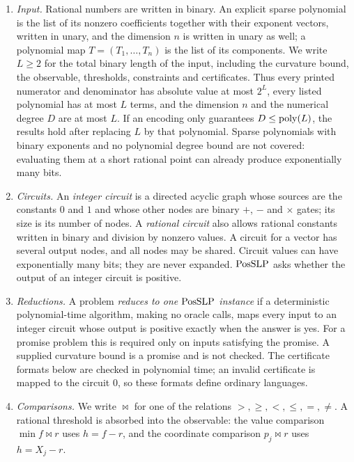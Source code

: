 \begin{enumerate}[label=(\roman*)]
\item \emph{Input.} Rational numbers are written in binary. An explicit
sparse polynomial is the list of its nonzero coefficients together with their
exponent vectors, written in unary, and the dimension $n$ is written in unary
as well; a polynomial map
$T=(T_1,\ldots,T_n)$ is the list of its components. We write $L\ge2$ for the
total binary length of the input, including the curvature bound, the
observable, thresholds, constraints and certificates. Thus every printed
numerator and denominator has absolute value at most $2^L$, every listed
polynomial has at most $L$ terms, and the dimension $n$ and the numerical
degree $D$ are at most $L$. If an encoding only guarantees
$D\le\operatorname{poly}(L)$, the results hold after replacing $L$ by that polynomial.
Sparse polynomials with binary exponents and no polynomial degree bound are
not covered: evaluating them at a short rational point can already produce
exponentially many bits.
\item \emph{Circuits.} An \emph{integer circuit} is a directed acyclic graph
whose sources are the constants $0$ and $1$ and whose other nodes are binary
$+$, $-$ and $\times$ gates; its size is its number of nodes. A
\emph{rational circuit} also allows rational constants written in binary and
division by nonzero values. A circuit for a vector has several output nodes,
and all nodes may be shared. Circuit values can have exponentially many bits;
they are never expanded. $\mathrm{PosSLP}$ asks whether the output of an integer
circuit is positive.
\item \emph{Reductions.} A problem \emph{reduces to one $\mathrm{PosSLP}$
instance} if a deterministic polynomial-time algorithm, making no oracle
calls, maps every input to an integer circuit whose output is positive
exactly when the answer is yes. For a promise problem this is required only on
inputs satisfying the promise. A supplied curvature bound is a promise and is
not checked. The certificate formats below are checked in polynomial time;
an invalid certificate is mapped to the circuit $0$, so these formats define
ordinary languages.
\item \emph{Comparisons.} We write ${\bowtie}$ for one of the relations
$>,\ge,<,\le,=,\ne$. A rational threshold is absorbed into the observable:
the value comparison $\min f\bowtie r$ uses $h=f-r$, and the coordinate
comparison $p_j\bowtie r$ uses $h=X_j-r$.
\end{enumerate}

